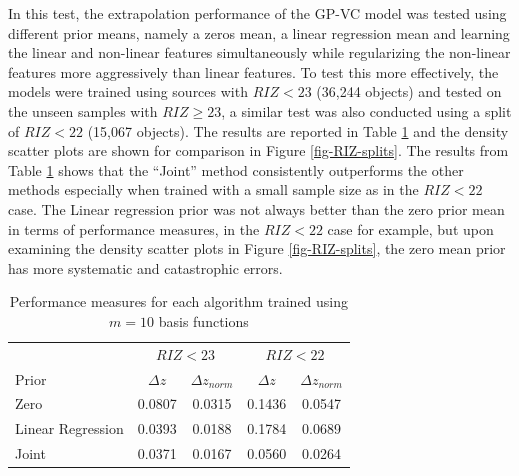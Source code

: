 \documentclass[useAMS,usenatbib,fleqn]{mn2e}
\begin{document}
In this test, the extrapolation performance of the GP-VC model was tested using different prior means, namely a zeros mean, a linear regression mean and learning the linear and non-linear features simultaneously while regularizing the non-linear features more aggressively than linear features. To test this more effectively,  the models were trained using sources with $RIZ<23$ (36,244 objects) and tested on the unseen samples with $RIZ\ge23$, a similar test was also conducted using a split of $RIZ<22$ (15,067 objects). The results are reported in Table \ref{table-RIZ-splits} and the density scatter plots are shown for comparison in Figure \ref{fig-RIZ-splits}. The results from Table \ref{table-RIZ-splits} shows that the ``Joint'' method consistently outperforms the other methods especially when trained with a small sample size as in the $RIZ<22$ case. The Linear regression prior was not always better than the zero prior mean in terms of performance measures, in the $RIZ<22$ case for example, but upon examining the density scatter plots in Figure \ref{fig-RIZ-splits}, the zero mean prior has more systematic and catastrophic errors.

 \begin{table}
\caption{Performance measures for each algorithm trained using $m=10$ basis functions}
\begin{center}
  \begin{tabular}{| l | c | c | c | c | }
  							& 	\multicolumn{2}{|c|}{$RIZ<23$}	& 	\multicolumn{2}{c}{$RIZ<22$} \\ \cline{2-5}
     	Prior					&	$\Delta z$	&	$\Delta z_{norm}$&	$\Delta z$	&	$\Delta z_{norm}$	\\	\hline
	Zero					&	0.0807		&	0.0315				&	0.1436		&	0.0547					\\	 
	Linear Regression	&	0.0393		&	0.0188				&	0.1784		&	0.0689					\\ 
	Joint					&	0.0371		&	0.0167				&	0.0560		&	0.0264					\\	\hline
  \end{tabular}
  \label{table-RIZ-splits}
\end{center}
\end{table}
\end{document}
